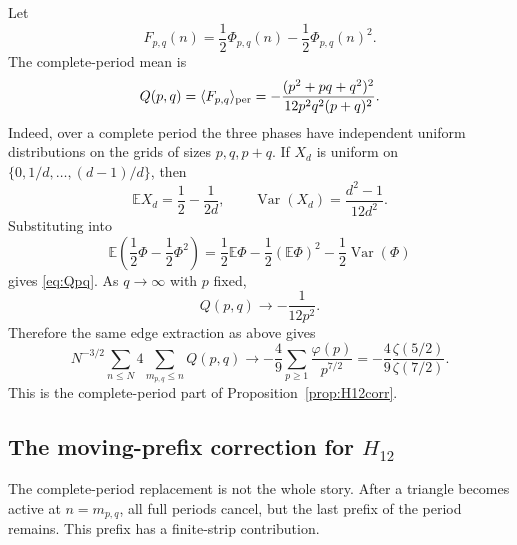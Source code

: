 \documentclass[a4paper,american,11pt]{amsart}
\theoremstyle{plain}
\theoremstyle{definition}
\begin{document}
Let
\[
 F_{p,q}(n)=\frac12\Phi_{p,q}(n)-\frac12\Phi_{p,q}(n)^2.
\]
The complete-period mean is
\begin{equation}\label{eq:Qpq}
 Q(p,q)=\langle F_{p,q}\rangle_{\rm per}
 =-
 \frac{(p^2+pq+q^2)^2}{12p^2q^2(p+q)^2}.
\end{equation}
Indeed, over a complete period the three phases have independent uniform
distributions on the grids of sizes \(p,q,p+q\).  If \(X_d\) is uniform on
\(\{0,1/d,\ldots,(d-1)/d\}\), then
\[
 \mathbb E X_d=\frac12-\frac{1}{2d},
 \qquad
 \operatorname{Var}(X_d)=\frac{d^2-1}{12d^2}.
\]
Substituting into
\[
 \mathbb E\left(\frac12\Phi-\frac12\Phi^2\right)
 =\frac12\mathbb E\Phi-\frac12(\mathbb E\Phi)^2-\frac12\operatorname{Var}(\Phi)
\]
gives \eqref{eq:Qpq}.  As \(q\to\infty\) with \(p\) fixed,
\[
 Q(p,q)\to -\frac{1}{12p^2}.
\]
Therefore the same edge extraction as above gives
\begin{equation}\label{eq:H12perLimit}
 N^{-3/2}\sum_{n\le N}4\sum_{m_{p,q}\le n}Q(p,q)
 \longrightarrow
 -\frac49\sum_{p\ge1}\frac{\varphi(p)}{p^{7/2}}
 =-\frac49\frac{\zeta(5/2)}{\zeta(7/2)}.
\end{equation}
This is the complete-period part of Proposition~\ref{prop:H12corr}.

\subsection{The moving-prefix correction for \(H_{12}\)}

The complete-period replacement is not the whole story.  After a triangle
becomes active at \(n=m_{p,q}\), all full periods cancel, but the last prefix
of the period remains.  This prefix has a finite-strip contribution.
\end{document}
